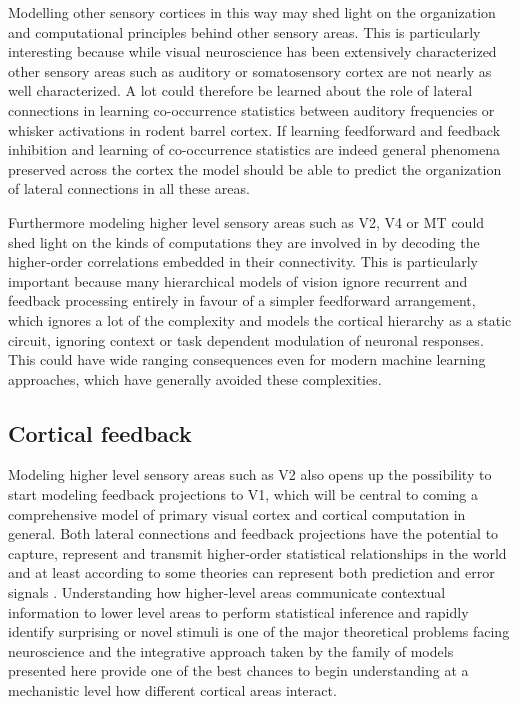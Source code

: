 Modelling other sensory cortices in this way may shed light on the
organization and computational principles behind other sensory
areas. This is particularly interesting because while visual
neuroscience has been extensively characterized other sensory areas
such as auditory or somatosensory cortex are not nearly as well
characterized. A lot could therefore be learned about the role of
lateral connections in learning co-occurrence statistics between
auditory frequencies or whisker activations in rodent barrel
cortex. If learning feedforward and feedback inhibition and learning
of co-occurrence statistics are indeed general phenomena preserved
across the cortex the model should be able to predict the organization
of lateral connections in all these areas.

Furthermore modeling higher level sensory areas such as V2, V4 or MT
could shed light on the kinds of computations they are involved in by
decoding the higher-order correlations embedded in their
connectivity. This is particularly important because many hierarchical
models of vision ignore recurrent and feedback processing entirely in
favour of a simpler feedforward arrangement, which ignores a lot of
the complexity and models the cortical hierarchy as a static circuit,
ignoring context or task dependent modulation of neuronal
responses. This could have wide ranging consequences even for modern
machine learning approaches, which have generally avoided these
complexities.

\subsection{Cortical feedback}

Modeling higher level sensory areas such as V2 also opens up the
possibility to start modeling feedback projections to V1, which will
be central to coming a comprehensive model of primary visual cortex
and cortical computation in general. Both lateral connections and
feedback projections have the potential to capture, represent and
transmit higher-order statistical relationships in the world and at
least according to some theories can represent both prediction and
error signals \citep{Rao1999, Spratling2011}. Understanding how
higher-level areas communicate contextual information to lower level
areas to perform statistical inference and rapidly identify surprising
or novel stimuli is one of the major theoretical problems facing
neuroscience and the integrative approach taken by the family of
models presented here provide one of the best chances to begin
understanding at a mechanistic level how different cortical areas
interact.

